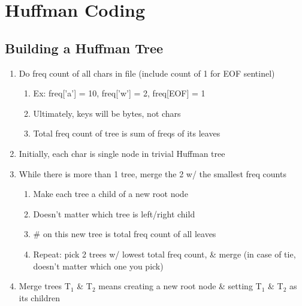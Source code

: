 \documentclass{article}
\begin{document}
\section{Huffman Coding}
\subsection{Building a Huffman Tree}
    \begin{enumerate}
        \item Do freq count of all chars in file (include count of 1 for EOF sentinel)
            \begin{enumerate}
                \item Ex: freq['a'] = 10, freq['w'] = 2, freq[EOF] = 1
                \item Ultimately, keys will be bytes, not chars
                \item Total freq count of tree is sum of freqs of its leaves
            \end{enumerate}
        \item Initially, each char is single node in trivial Huffman tree
        \item While there is more than 1 tree, merge the 2 w/ the smallest freq counts
            \begin{enumerate}
                \item Make each tree a child of a new root node
                \item Doesn't matter which tree is left/right child
                \item \# on this new tree is total freq count of all leaves
                \item Repeat: pick 2 trees w/ lowest total freq count, \& merge (in case of tie, doesn't matter which one you pick)
            \end{enumerate}
        \item Merge trees T$_1$ \& T$_2$ means creating a new root node \& setting T$_1$ \& T$_2$ as its children
    \end{enumerate}
\end{document}
